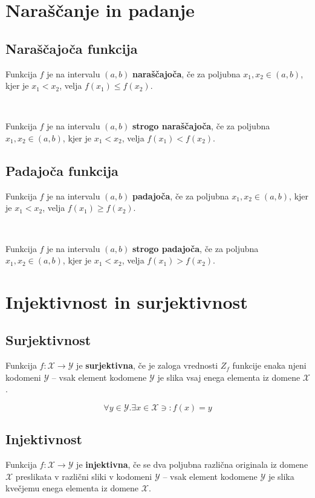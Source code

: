         \section{Naraščanje in padanje}

            \subsection*{Naraščajoča funkcija}

                Funkcija $f$ je na intervalu $(a,b)$ \textbf{naraščajoča}, če za poljubna $x_1,x_2\in(a,b)$, kjer je $x_1<x_2$, velja $f(x_1)\leq f(x_2)$.

                ~

                Funkcija $f$ je na intervalu $(a,b)$ \textbf{strogo naraščajoča}, če za poljubna $x_1,x_2\in(a,b)$, kjer je $x_1<x_2$, velja $f(x_1)<f(x_2)$.
            

            \subsection*{Padajoča funkcija}
                Funkcija $f$ je na intervalu $(a,b)$ \textbf{padajoča}, če za poljubna $x_1,x_2\in(a,b)$, kjer je $x_1<x_2$, velja $f(x_1)\geq f(x_2)$.
                
                ~

                Funkcija $f$ je na intervalu $(a,b)$ \textbf{strogo padajoča}, če za poljubna $x_1,x_2\in(a,b)$, kjer je $x_1<x_2$, velja $f(x_1)>f(x_2)$.



        \section{Injektivnost in surjektivnost}

            \subsection*{Surjektivnost}
                Funkcija $f:\mathcal{X}\to\mathcal{Y}$ je \textbf{surjektivna}, če je zaloga vrednosti $Z_f$ funkcije enaka njeni kodomeni $\mathcal{Y}$ -- vsak element kodomene $\mathcal{Y}$ je slika vsaj enega elementa iz domene $\mathcal{X}$.

                $$\forall y\in\mathcal{Y}. \exists x\in\mathcal{X}\ni:f(x)=y$$

            \subsection*{Injektivnost}
                Funkcija $f:\mathcal{X}\to\mathcal{Y}$ je \textbf{injektivna}, če se dva poljubna različna originala iz domene $\mathcal{X}$ preslikata v različni sliki v kodomeni $\mathcal{Y}$ -- vsak element kodomene $\mathcal{Y}$ je slika kvečjemu enega elementa iz domene $\mathcal{X}$.

